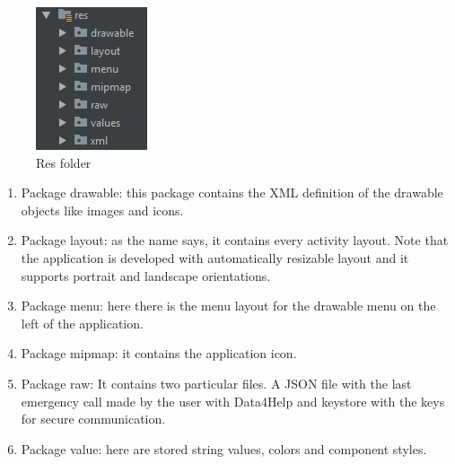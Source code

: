 \begin{figure}[H]
\includegraphics[width=\linewidth]{images/Res.png}
\caption{ Res folder }
\label{fig:pkgsharedata}
\end{figure}

\begin{enumerate}
\item Package drawable: this package contains the XML definition of the drawable objects like images and icons.
\item Package layout: as the name says, it contains every activity layout. 
Note that the application is developed with automatically resizable layout and it supports portrait and landscape orientations.
\item Package menu: here there is the menu layout for the drawable menu on the left of the application.
\item Package mipmap: it contains the application icon.
\item Package raw: It contains two particular files. A JSON file with the last emergency call made by the user with Data4Help and keystore with the keys for secure communication.
\item Package value: here are stored string values, colors and component styles. 
\end{enumerate}

